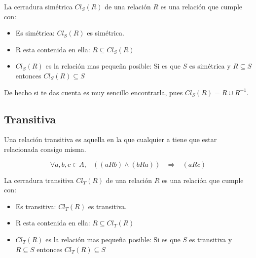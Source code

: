 \documentclass[12pt]{report}                                    %
\DeclareMathOperator \Space {\quad}                             %
\DeclareMathOperator \MiniSpace {\;}                            %
\newcommand \lequal {\MiniSpace \Leftrightarrow \MiniSpace}     %
\newcommand \linfire {\MiniSpace \Rightarrow \MiniSpace}        %
\begin{document}
                La cerradura simétrica $Cl_S(R)$ de una relación $R$ es una relación que cumple con:

                \begin{itemize}
                    \item Es simétrica: $Cl_S(R)$ es simétrica. 
                    \item R esta contenida en ella: $R \subseteq Cl_S(R)$
                    \item $Cl_S(R)$ es la relación mas pequeña posible: 
                    Si es que $S$ es simétrica y $R \subseteq S$ entonces $Cl_S(R) \subseteq S$
                \end{itemize}



                De hecho si te das cuenta es muy sencillo encontrarla, pues
                $Cl_S(R) = R \cup R^{-1}$.



            \clearpage
            \subsection{Transitiva}

                Una relación transitiva es aquella en la que cualquier a tiene que estar relacionada consigo
                misma.

                \begin{equation}
                    \forall a,b,c \in A, \MiniSpace ((aRb) \land (bRa)) \linfire (aRc)
                \end{equation}

                La cerradura transitiva $Cl_T(R)$ de una relación $R$ es una relación que cumple con:

                \begin{itemize}
                    \item Es transitiva: $Cl_T(R)$ es transitiva. 
                    \item R esta contenida en ella: $R \subseteq Cl_T(R)$
                    \item $Cl_T(R)$ es la relación mas pequeña posible: 
                    Si es que $S$ es transitiva y $R \subseteq S$ entonces $Cl_T(R) \subseteq S$
                \end{itemize}


            \clearpage
\end{document}
